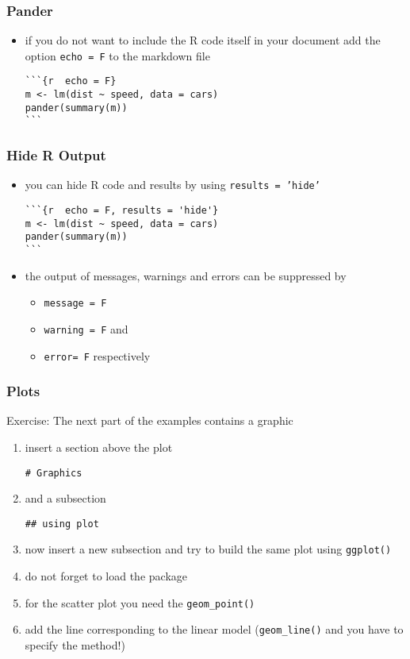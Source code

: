 \begin{frame}[fragile]\frametitle{Pander}
  \begin{itemize}
  \item if you do not want to include the R code itself in your document add the option \texttt{echo = F} to the markdown file
\begin{verbatim}
```{r  echo = F}
m <- lm(dist ~ speed, data = cars)
pander(summary(m))
```
\end{verbatim}
  \end{itemize}
\end{frame}


\begin{frame}[fragile]\frametitle{Hide R Output}
  \begin{itemize}
  \item you can hide R code and results by using \texttt{results = 'hide'}
\begin{verbatim}
```{r  echo = F, results = 'hide'}
m <- lm(dist ~ speed, data = cars)
pander(summary(m))
```
\end{verbatim}
  \item the output of messages, warnings and errors can be suppressed by
    \begin{itemize}
    \item \texttt{message = F}
    \item \texttt{warning = F} and
    \item \texttt{error= F} respectively
    \end{itemize}
  \end{itemize}
\end{frame}

  
\begin{frame}[fragile]\frametitle{Plots}
Exercise: The next part of the examples contains a graphic
  \begin{enumerate}
  \item insert a section above the plot
\begin{verbatim}
# Graphics
\end{verbatim}
  \item and a subsection
\begin{verbatim}
## using plot
\end{verbatim}
    
  \item now insert a new subsection and try to build the same plot using \texttt{ggplot()}
  \item do not forget to load the package
  \item for the scatter plot you need the \texttt{geom\_point()}
  \item add the line corresponding to the linear model (\texttt{geom\_line()} and you have to specify the method!)
  \end{enumerate}
\end{frame}


